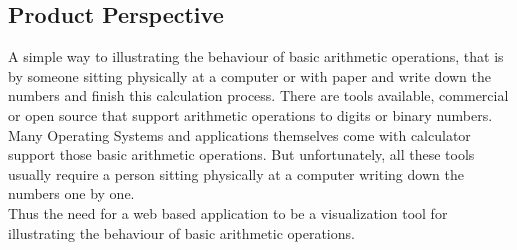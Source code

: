 \documentclass[11pt]{article}
\begin{document}


\subsection{Product Perspective}%
A simple way to illustrating the behaviour of basic arithmetic operations, that is by someone sitting physically at a computer or with paper and write down the numbers and finish this calculation process. There are tools available, commercial or open source that support arithmetic operations to digits or binary numbers. Many Operating Systems and applications themselves come with calculator support those basic arithmetic operations. But unfortunately, all these tools usually require a person sitting physically at a computer writing down the numbers one by one.\\

Thus the need for a web based application to be a visualization tool for illustrating the behaviour of basic arithmetic operations.
\end{document}
